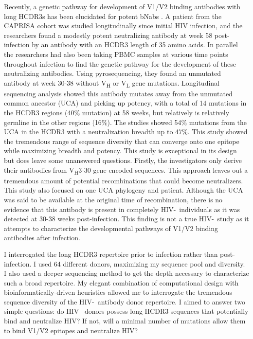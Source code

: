 Recently, a genetic pathway for development of V1/V2 binding antibodies with long HCDR3s has been elucidated for potent bNabs \citep{DoriaRose:2014ic}. A patient from the CAPRISA cohort was studied longitudinally since initial HIV infection, and the researchers found a modestly potent neutralizing antibody at week 58 post-infection by an antibody with an HCDR3 length of 35 amino acids. In parallel the researchers had also been taking PBMC samples at various time points throughout infection to find the genetic pathway for the development of these neutralizing antibodies. Using pyrosequencing, they found an unmutated antibody at week 30-38 without V\textsubscript{H} or V\textsubscript{L} gene mutations. Longitudinal sequencing analysis showed this antibody mutates away from the unmutated common ancestor (UCA) and picking up potency, with a total of 14 mutations in the HCDR3 regions (40\% mutation) at 58 weeks, but relatively is  relatively germline in the other regions (16\%). The studies showed 54\% mutations from the UCA in the HCDR3 with a neutralization breadth up to 47\%. This study showed the tremendous range of sequence diversity that can converge onto one epitope while maximizing breadth and potency. This study is exceptional in its design but does leave some unanswered questions. Firstly, the investigators only derive their antibodies from V\textsubscript{H}3-30 gene encoded sequences. This approach leaves out a tremendous amount of potential recombinations that could become neutralizers. This study also focused on one UCA phylogeny and patient. Although the UCA was said to be available at the original time of recombination, there is no evidence that this antibody is present in completely HIV-\naive~individuals as it was detected at 30-38 weeks post-infection. This finding is not a true HIV-\naive~study as it attempts to characterize the developmental pathways of V1/V2 binding antibodies after infection.

I interrogated the long HCDR3 repertoire prior to infection rather than post-infection. I used 64 different donors, maximizing my sequence pool and diversity. I also used a deeper sequencing method to get the depth necessary to characterize such a broad repertoire. My elegant combination of computational design with bioinformatically-driven heuristics allowed me to interrogate the tremendous sequence diversity of the HIV-\naive~antibody donor repertoire. I aimed to answer two simple questions: do HIV-\naive~donors possess long HCDR3 sequences that potentially bind and neutralize HIV? If not, will a minimal number of mutations allow them to bind V1/V2 epitopes and neutralize HIV?

